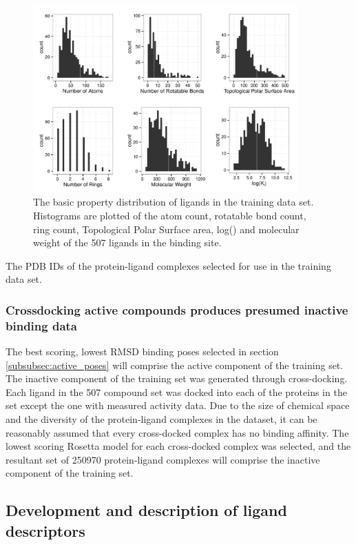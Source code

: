 \begin{figure}
\centering
\includegraphics[width=4in]{figures/hts/basic_ligand_properties.pdf}
\caption{
The basic property distribution of ligands in the training data set.  Histograms are plotted of the atom count, rotatable bond count, ring count, Topological Polar Surface area, log(\ki) and molecular weight of the 507 ligands in the binding site. 
}
\label{fig:training_ligands}
\end{figure}
\begin{table}
\scriptsize
\renewcommand{\tabcolsep}{0.09cm}
\centering

\caption{The PDB IDs of the protein-ligand complexes selected for use in the training data set.}
\label{table:training_pdbs}
\end{table}

\subsubsection{Crossdocking active compounds produces presumed inactive binding data}
The best scoring, lowest RMSD binding poses selected in section \ref{subsubsec:active_poses} will comprise the active component of the training set.
The inactive component of the training set was generated through cross-docking.
Each ligand in the 507 compound set was docked into each of the proteins in the set except the one with measured activity data.
Due to the size of chemical space\citep{Reymond:2012un} and the diversity of the protein-ligand complexes in the dataset, it can be reasonably assumed that every cross-docked complex has no binding affinity.
The lowest scoring Rosetta model for each cross-docked complex was selected, and the resultant set of 250970 protein-ligand complexes will comprise the inactive component of the training set.

\subsection{Development and description of ligand descriptors}
\label{subsec:descriptor_development}
